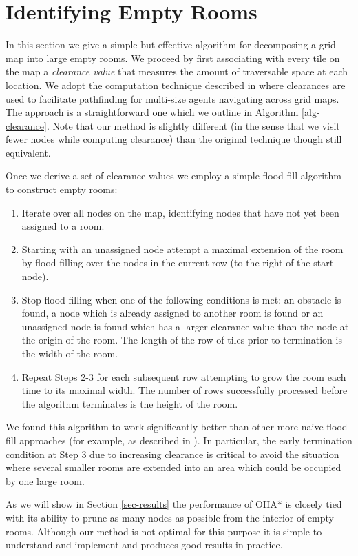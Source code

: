 \section{Identifying Empty Rooms}
\label{empty rooms}
In this section we give a simple but effective algorithm for decomposing a grid map
into large empty rooms.
We proceed by first associating with every tile on the map a \emph{clearance value} 
that measures the amount of traversable space at each location.
We adopt the computation technique described in \cite{harabor08} where clearances
are used to facilitate pathfinding for multi-size agents navigating across grid maps.
The approach is a straightforward one which we outline in Algorithm \ref{alg-clearance}.
Note that our method is slightly different (in the sense that we visit fewer nodes
while computing clearance) than the original technique though still equivalent. 



Once we derive a set of clearance values we employ a simple flood-fill algorithm to 
construct empty rooms:

\begin{enumerate}
\item{Iterate over all nodes on the map, identifying nodes that have not yet 
been assigned to a room.}
\item{Starting with an unassigned node attempt a maximal extension of the room
by flood-filling over the nodes in the current row (to the right of the start node).}
\item{Stop flood-filling when one of the following conditions is met: an obstacle is found,
a node which is already assigned to another room is found or an unassigned
node is found which has a larger clearance value than the node at the origin of the room.
The length of the row of tiles prior to termination is the width of the room.}
\item{Repeat Steps 2-3 for each subsequent row attempting to grow the room
each time to its maximal width.
The number of rows successfully processed before the algorithm terminates is the height of the room.}
\end{enumerate}

We found this algorithm to work significantly better than other more naive flood-fill
approaches (for example, as described in \cite{bjornsson06,bolanca09}). 
In particular, the early termination condition at Step 3 
due to increasing clearance is critical to avoid the situation where
several smaller rooms are extended into an area which could be occupied by one large room.

As we will show in Section \ref{sec-results} the performance of OHA* is closely
tied with its ability to prune as many nodes as possible from the interior of 
empty rooms. 
Although our method is not optimal for this purpose it is simple
to understand and implement and produces good results in practice.
